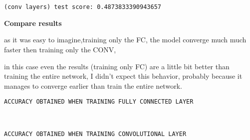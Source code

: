 \documentclass[11pt]{article}
\begin{document}
    \begin{center}
    \end{center}
    { \hspace*{\fill} \\}
    
    
    
    \begin{center}
    \end{center}
    { \hspace*{\fill} \\}
    
    

    
    \begin{Verbatim}[commandchars=\\\{\}]
 (conv layers) test score: 0.4873833390943657
 \end{Verbatim}

    \textbf{Compare results}

as it was easy to imagine,training only the FC, the model converge much
much faster then training only the CONV,

in this case even the results (training only FC) are a little bit better
than training the entire network, I didn't expect this behavior,
probably because it manages to converge earlier than train the entire
network.

    \begin{Verbatim}[commandchars=\\\{\}]
ACCURACY OBTAINED WHEN TRAINING FULLY CONNECTED LAYER
\end{Verbatim}

    \begin{center}
    \end{center}
    { \hspace*{\fill} \\}
    


    
    \begin{Verbatim}[commandchars=\\\{\}]
ACCURACY OBTAINED WHEN TRAINING CONVOLUTIONAL LAYER
\end{Verbatim}

    \begin{center}
    \end{center}
    { \hspace*{\fill} \\}
    
\end{document}
